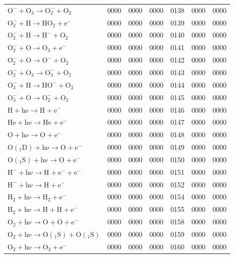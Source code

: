 \begin{longtable}{lrrrrrr}
$\mathrm{O^{-} + O_3 \rightarrow O_2^{-} + O_2}$ & 0000 & 0000 & 0000 & 0138 & 0000 & 0000 \\
$\mathrm{O_2^{-} + H \rightarrow HO_2 + e^{-}}$ & 0000 & 0000 & 0000 & 0139 & 0000 & 0000 \\
$\mathrm{O_2^{-} + H \rightarrow H^{-} + O_2}$ & 0000 & 0000 & 0000 & 0140 & 0000 & 0000 \\
$\mathrm{O_2^{-} + O \rightarrow O_3 + e^{-}}$ & 0000 & 0000 & 0000 & 0141 & 0000 & 0000 \\
$\mathrm{O_2^{-} + O \rightarrow O^{-} + O_2}$ & 0000 & 0000 & 0000 & 0142 & 0000 & 0000 \\
$\mathrm{O_2^{-} + O_3 \rightarrow O_3^{-} + O_2}$ & 0000 & 0000 & 0000 & 0143 & 0000 & 0000 \\
$\mathrm{O_3^{-} + H \rightarrow HO^{-} + O_2}$ & 0000 & 0000 & 0000 & 0144 & 0000 & 0000 \\
$\mathrm{O_3^{-} + O \rightarrow O_2^{-} + O_2}$ & 0000 & 0000 & 0000 & 0145 & 0000 & 0000 \\
$\mathrm{H + h\nu \rightarrow H^{} + e^{-}}$ & 0000 & 0000 & 0000 & 0146 & 0000 & 0000 \\
$\mathrm{He + h\nu \rightarrow He^{} + e^{-}}$ & 0000 & 0000 & 0000 & 0147 & 0000 & 0000 \\
$\mathrm{O + h\nu \rightarrow O^{} + e^{-}}$ & 0000 & 0000 & 0000 & 0148 & 0000 & 0000 \\
$\mathrm{O(_1D) + h\nu \rightarrow O^{} + e^{-}}$ & 0000 & 0000 & 0000 & 0149 & 0000 & 0000 \\
$\mathrm{O(_1S) + h\nu \rightarrow O^{} + e^{-}}$ & 0000 & 0000 & 0000 & 0150 & 0000 & 0000 \\
$\mathrm{H^{-} + h\nu \rightarrow H^{} + e^{-} + e^{-}}$ & 0000 & 0000 & 0000 & 0151 & 0000 & 0000 \\
$\mathrm{H^{-} + h\nu \rightarrow H + e^{-}}$ & 0000 & 0000 & 0000 & 0152 & 0000 & 0000 \\
$\mathrm{H_2 + h\nu \rightarrow H_2^{} + e^{-}}$ & 0000 & 0000 & 0000 & 0154 & 0000 & 0000 \\
$\mathrm{H_2 + h\nu \rightarrow H^{} + H + e^{-}}$ & 0000 & 0000 & 0000 & 0155 & 0000 & 0000 \\
$\mathrm{O_2 + h\nu \rightarrow O^{} + O + e^{-}}$ & 0000 & 0000 & 0000 & 0158 & 0000 & 0000 \\
$\mathrm{O_2 + h\nu \rightarrow O(_1S) + O(_1S)}$ & 0000 & 0000 & 0000 & 0159 & 0000 & 0000 \\
$\mathrm{O_2 + h\nu \rightarrow O_2^{} + e^{-}}$ & 0000 & 0000 & 0000 & 0160 & 0000 & 0000 \\

\end{longtable}
